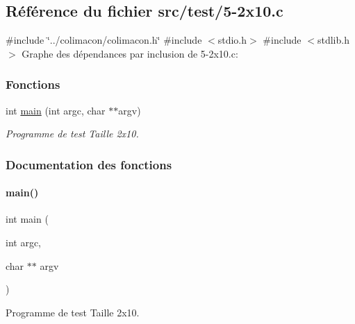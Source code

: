 \hypertarget{5-2x10_8c}{}\subsection{Référence du fichier src/test/5-\/2x10.c}
\label{5-2x10_8c}
{\ttfamily \#include \char`\"{}../colimacon/colimacon.\+h\char`\"{}}\newline
{\ttfamily \#include $<$stdio.\+h$>$}\newline
{\ttfamily \#include $<$stdlib.\+h$>$}\newline
Graphe des dépendances par inclusion de 5-\/2x10.c\+:
\subsubsection*{Fonctions}
\begin{DoxyCompactItemize}
\item 
int \hyperlink{5-2x10_8c_a3c04138a5bfe5d72780bb7e82a18e627}{main} (int argc, char $\ast$$\ast$argv)
\begin{DoxyCompactList}\small\item\em Programme de test Taille 2x10. \end{DoxyCompactList}\end{DoxyCompactItemize}


\subsubsection{Documentation des fonctions}
\mbox{\label{5-2x10_8c_a3c04138a5bfe5d72780bb7e82a18e627}} 
\paragraph{\texorpdfstring{main()}{main()}}
{\footnotesize\ttfamily int main (\begin{DoxyParamCaption}\item[{int}]{argc,  }\item[{char $\ast$$\ast$}]{argv }\end{DoxyParamCaption})}



Programme de test Taille 2x10. 

